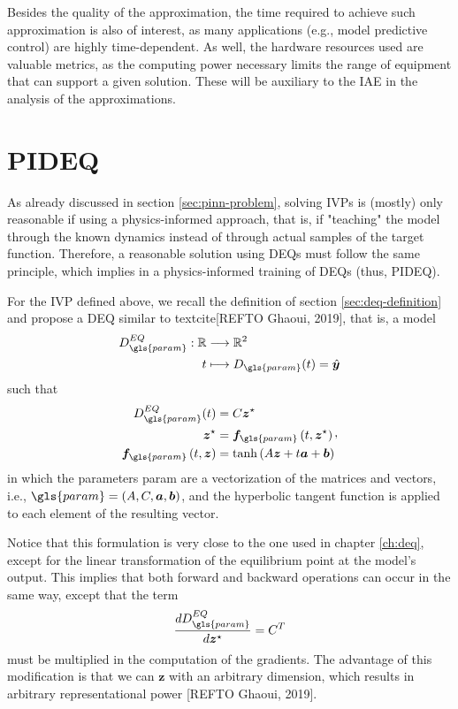 Besides the quality of the approximation, the time required to achieve such approximation is also of interest, as many applications (e.g., model predictive control) are highly time-dependent.
As well, the hardware resources used are valuable metrics, as the computing power necessary limits the range of equipment that can support a given solution.
These will be auxiliary to the \gls{IAE} in the analysis of the approximations.

\section{PIDEQ}

As already discussed in section \ref{sec:pinn-problem}, solving \gls{IVP}s is (mostly) only reasonable if using a physics-informed approach, that is, if "teaching" the model through the known dynamics instead of through actual samples of the target function.
Therefore, a reasonable solution using \gls{DEQ}s must follow the same principle, which implies in a physics-informed training of \gls{DEQ}s (thus, \gls{PIDEQ}).

For the \gls{IVP} defined above, we recall the definition of section \ref{sec:deq-definition} and propose a \gls{DEQ} similar to textcite[REFTO Ghaoui, 2019], that is, a model
\begin{align*}
    D_{\gls{param}}^{EQ}: \R &\longrightarrow \R^2 \\
    t &\longmapsto D_{\gls{param}}(t) = \hat{\bm{y}}
\end{align*}
such that
\begin{equation}
\begin{split}
    D^{EQ}_{\gls{param}}(t) &= C\bm{z}^{\star} \\
    \bm{z}^{\star} &= \bm{f}_{\gls{param}}\left( t,\bm{z}^{\star} \right) \\
    \bm{f}_{\gls{param}}\left( t,\bm{z} \right) &= \tanh \left( A\bm{z} + t\bm{a} + \bm{b} \right)
\end{split}
,\end{equation}
in which the parameters \gls{param} are a vectorization of the matrices and vectors, i.e., $\gls{param} = \left( A,C,\bm{a},\bm{b} \right)$, and the hyperbolic tangent function is applied to each element of the resulting vector.

Notice that this formulation is very close to the one used in chapter \ref{ch:deq}, except for the linear transformation of the equilibrium point at the model's output.
This implies that both forward and backward operations can occur in the same way, except that the term  \[
    \frac{d D^{EQ}_{\gls{param}}}{d \bm{z}^{\star}} = C^T
\] must be multiplied in the computation of the gradients.
The advantage of this modification is that we can $\bm{z}$ with an arbitrary dimension, which results in arbitrary representational power [REFTO Ghaoui, 2019].

